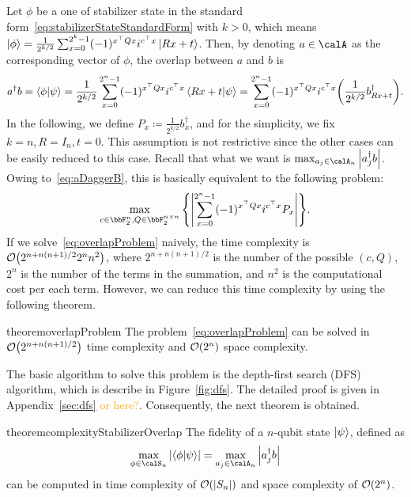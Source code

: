 \documentclass[a4paper, onecolumn, 11pt, longbibliography]{quantumarticle}
\newcommand{\orange}[1]{\textcolor{orange}{#1}}
\newcommand{\defeq}{\coloneqq}
\begin{document}
Let $\phi$ be a one of stabilizer state
in the standard form~\eqref{eq:stabilizerStateStandardForm}
with $k>0$, which means
$\ket{\phi} = \frac{1}{2^{k/2}}\sum_{x=0}^{2^k-1} (-1)^{x^\top Q x} i^{c^\top x} \ket{Rx+t}$.
Then, by denoting $a \in \calA$ as the corresponding vector of $\phi$,
the overlap between $a$ and $b$ is
\begin{equation}\label{eq:aDaggerB}
  a^\dagger b
  = \braket{\phi}{\psi}
  = \frac{1}{2^{k/2}} \sum_{x=0}^{2^n-1} (-1)^{x^\top Q x} i^{c^\top x} \braket{Rx+t}{\psi}
  = \sum_{x=0}^{2^n-1} (-1)^{x^\top Q x} i^{c^\top x} \qty(\frac{1}{2^{k/2}}b_{Rx+t}^\dagger).
\end{equation}
In the following, we define $P_x \defeq \frac{1}{2^{k/2}}b_x^\dagger$,
and for the simplicity, we fix $k=n,R=I_n,t=0$.
This assumption is not restrictive since
the other cases can be easily reduced to this case.
Recall that what we want is
$\max_{a_j \in \calA_n} \abs{a_j^\dagger b}$.
Owing to~\eqref{eq:aDaggerB},
this is basically equivalent to the following problem:
\begin{equation}\label{eq:overlapProblem}
  \max_{c\in \bbF_2^{n},Q\in \bbF_2^{n \times n}} \qty{ \abs{\sum_{x=0}^{2^n-1} (-1)^{x^\top Q x} i^{c^\top x} P_x} }.
\end{equation}
If we solve~\eqref{eq:overlapProblem} naively,
the time complexity is $\order{2^{n+n(n+1)/2} 2^n n^2}$,
where $2^{n+n(n+1)/2}$ is the number of the possible $(c,Q)$,
$2^n$ is the number of the terms in the summation,
and $n^2$ is the computational cost per each term.
However, we can reduce this time complexity
by using the following theorem.
\begin{restatable}{theorem}{overlapProblem}
  \label{thm:overlapProblem}
  The problem~\eqref{eq:overlapProblem} can be solved
  in $\order{2^{n+n(n+1)/2}}$ time complexity and $\order{2^n}$ space complexity.
\end{restatable}
The basic algorithm to solve this problem
is the depth-first search (DFS) algorithm,
which is describe in Figure~\ref{fig:dfs}.
The detailed proof is given in Appendix~\ref{sec:dfs}
\orange{or here?}.
Consequently, the next theorem is obtained.
\begin{restatable}{theorem}{complexityStabilizerOverlap}
  \label{thm:complexityStabilizerOverlap}
  The fidelity of a $n$-qubit state $\ket{\psi}$, defined as
  \begin{equation*}
    \max_{\phi \in \calS_n} \abs{\braket{\phi}{\psi}} = \max_{a_j \in \calA_n} \abs{a_j^\dagger b}
  \end{equation*}
  can be computed
  in time complexity of
  $\order{\abs{S_n}}$ and
  space complexity of $\order{2^n}$.
\end{restatable}
\end{document}
